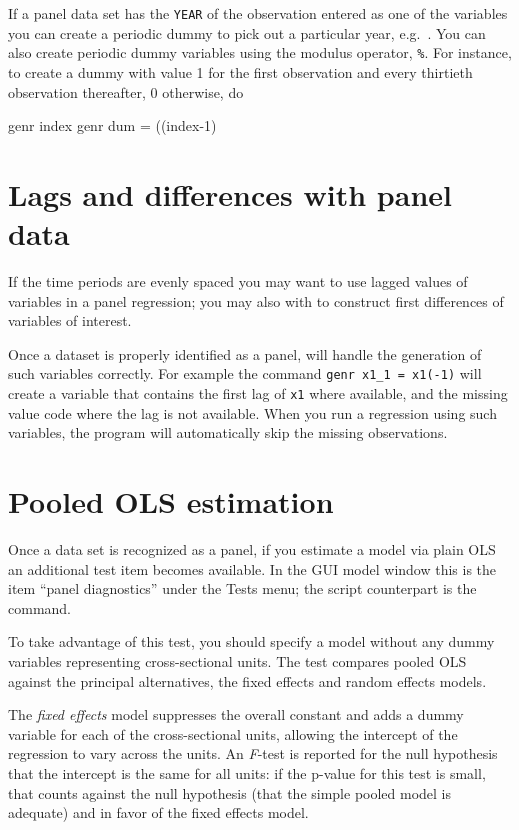 If a panel data set has the \verb+YEAR+ of the observation entered as
one of the variables you can create a periodic dummy to pick out a
particular year, e.g.\ .  You can also
create periodic dummy variables using the modulus operator,
\verb+%+.  For instance, to create a dummy with
value 1 for the first observation and every thirtieth observation
thereafter, 0 otherwise, do
\begin{code}
      genr index 
      genr dum = ((index-1)%
\end{code}

\section{Lags and differences with panel data}
\label{panel-lagged}

If the time periods are evenly spaced you may want to use lagged
values of variables in a panel regression; you may also with to
construct first differences of variables of interest.

Once a dataset is properly identified as a panel,  will
handle the generation of such variables correctly.  For example the
command \verb+genr x1_1 = x1(-1)+ will create a variable that contains
the first lag of \verb+x1+ where available, and the missing value code
where the lag is not available.  When you run a regression using such
variables, the program will automatically skip the missing
observations.

\section{Pooled OLS estimation}
\label{pooled-est}

Once a data set is recognized as a panel, if you estimate a model via
plain OLS an additional test item becomes available.  In the GUI
model window this is the item ``panel diagnostics'' under the
\textsf{Tests} menu; the script counterpart is the 
command.  

To take advantage of this test, you should specify a model without any
dummy variables representing cross-sectional units.  The test compares
pooled OLS against the principal alternatives, the fixed effects and
random effects models.

The \emph{fixed effects} model suppresses the overall constant and
adds a dummy variable for each of the cross-sectional units, allowing
the intercept of the regression to vary across the units.  An
\emph{F}-test is reported for the null hypothesis that the intercept
is the same for all units: if the p-value for this test is small, that
counts against the null hypothesis (that the simple pooled model is
adequate) and in favor of the fixed effects model.

